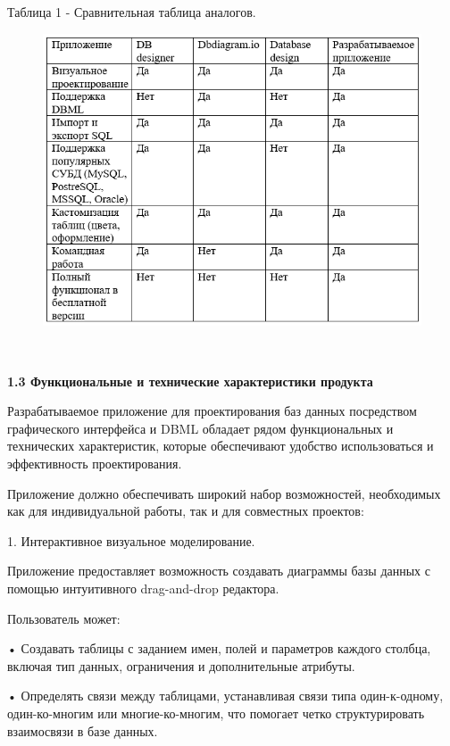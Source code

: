 \newpage
Таблица 1 - Сравнительная таблица аналогов.
\begin{figure}[htbp]
    \centering %
    \includegraphics[width=1\textwidth]{images/analyze_table.png} %
    \label{fig:analyze} %
\end{figure}

\

\textbf{\large 1.3 Функциональные и технические характеристики продукта}

Разрабатываемое приложение для проектирования баз данных посредством графического интерфейса и DBML обладает рядом функциональных и технических характеристик, которые обеспечивают удобство использоваться и эффективность проектирования.

Приложение должно обеспечивать широкий набор возможностей, необходимых как для индивидуальной работы, так и для совместных проектов:

1. Интерактивное визуальное моделирование.

Приложение предоставляет возможность создавать диаграммы базы данных с помощью интуитивного drag-and-drop редактора.

Пользователь может:

• Создавать таблицы с заданием имен, полей и параметров каждого столбца, включая тип данных, ограничения и дополнительные атрибуты.

• Определять связи между таблицами, устанавливая связи типа один-к-одному, один-ко-многим или многие-ко-многим, что помогает четко структурировать взаимосвязи в базе данных.

